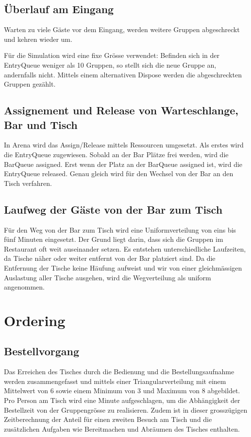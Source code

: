 \documentclass[ngerman,a4paper,12pt]{scrreprt}
\begin{document}
		\subsection{Überlauf am Eingang}
			Warten zu viele Gäste vor dem Eingang, werden weitere Gruppen abgeschreckt und kehren wieder um.
		
			Für die Simulation wird eine fixe Grösse verwendet: 			Befinden sich in der EntryQueue weniger als 10 Gruppen, so stellt sich die neue Gruppe an, andernfalls nicht. Mittels einem alternativen Dispose werden die abgeschreckten Gruppen gezählt.
			
			
		\subsection{Assignement und Release von Warteschlange, Bar und Tisch}
			In Arena wird das Assign/Release mittels Ressourcen umgesetzt. Als erstes wird die EntryQueue zugewiesen. Sobald an der Bar Plätze frei werden, wird die BarQueue assigned. Erst wenn der Platz an der BarQueue assigned ist, wird die EntryQueue released. Genau gleich wird für den Wechsel von der Bar an den Tisch verfahren.
	
	
		\subsection{Laufweg der Gäste von der Bar zum Tisch}
			Für den Weg von der Bar zum Tisch wird eine Uniformverteilung von eins bis fünf Minuten eingesetzt. Der Grund liegt darin, dass sich die Gruppen im Restaurant oft weit auseinander setzen. Es entstehen unterschiedliche Laufzeiten, da Tische näher oder weiter entfernt von der Bar platziert sind. Da die Entfernung der Tische keine Häufung aufweist und wir von einer gleichmässigen Auslastung aller Tische ausgehen, wird die Wegverteilung als uniform angenommen.
	
	
	\section{Ordering}			
		\subsection{Bestellvorgang}
			Das Erreichen des Tisches durch die Bedienung und die Bestellungsaufnahme werden zusammengefasst und mittels einer Triangularverteilung mit einem Mittelwert von 6 sowie einem Minimum von 3 und Maximum von 8 abgebildet. Pro Person am Tisch wird eine Minute aufgeschlagen, um die Abhängigkeit der Bestellzeit von der Gruppengrösse zu realisieren. Zudem ist in dieser grosszügigen Zeitberechnung der Anteil für einen zweiten Besuch am Tisch und die zusätzlichen Aufgaben wie Bereitmachen und Abräumen des Tisches enthalten.
	
\end{document}
